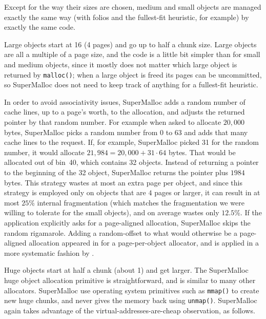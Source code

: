 \documentclass[natbib,sort&compress,10pt]{sigplanconf}
\newcommand{\code}[1]{\texttt{#1}}
\begin{document}
Except for the way their sizes are chosen, medium and small objects
are managed exactly the same way (with folios and the fullest-fit
heuristic, for example) by exactly the same code.


Large objects start at \unit{16}\kibi\byte{} (4 pages) and go up to
half a chunk size.  Large objects are all a multiple of a page size,
and the code is a little bit simpler than for small and medium
objects, since it mostly does not matter which large object is
returned by \code{malloc()}; when a large object is freed its pages
can be uncommitted, so SuperMalloc does not need to keep track of
anything for a fullest-fit heuristic.

In order to avoid associativity issues, SuperMalloc adds a random
number of cache lines, up to a page's worth, to the allocation, and
adjusts the returned pointer by that random number.  For example when
asked to allocate $20,000$ bytes, SuperMalloc picks a random number
from 0 to 63 and adds that many cache lines to the request.  If, for
example, SuperMalloc picked 31 for the random number, it would
allocate $21,984 = 20,000+31\cdot64$ bytes.  That would be allocated
out of bin~40, which contains \unit{32}\kibi\byte{} objects.  Instead
of returning a pointer to the beginning of the \unit{32}\kibi\byte{} object,
SuperMalloc returns the pointer plus $1984$ bytes.  This strategy
wastes at most an extra page per object, and since this strategy is
employed only on objects that are $4$ pages or larger, it can result
in at most $25$\% internal fragmentation (which matches the
fragmentation we were willing to tolerate for the small objects), and
on average wastes only $12.5$\%.  If the application explicitly asks
for a page-aligned allocation, SuperMalloc skips the random
rigamarole.  Adding a random-offset to what would otherwise be a
page-aligned allocation appeared in \cite{LvinNoBe08} for a
page-per-object allocator, and is applied in a more systematic fashion
by \cite{AfekDiMo11}.


Huge objects start at half a chunk (about \unit{1}\mebi\byte{}) and
get larger.  The SuperMalloc huge object allocation primitive is
straightforward, and is similar to many other allocators.  SuperMalloc
use operating system primitives such as \code{mmap()} to create new
huge chunks, and never gives the memory back using \code{unmap()}.
SuperMalloc again takes advantage of the virtual-addresses-are-cheap
observation, as follows.
\end{document}
